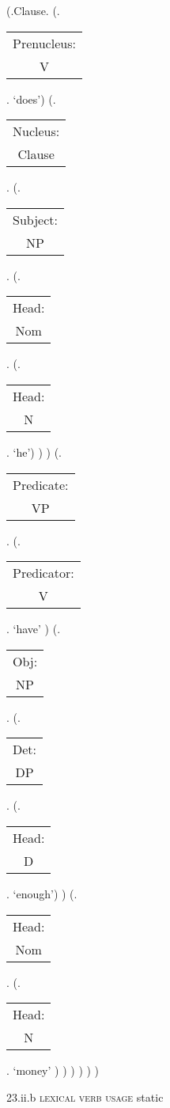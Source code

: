 \documentclass[12pt,letterpaper]{article}
\begin{document}
\begin{figure}
	\begin{center}
		\begin{parsetree}
			(.Clause.
			(.\begin{tabular}{c}Prenucleus:\\V\end{tabular}. `does')
			(.\begin{tabular}{c}Nucleus:\\Clause\end{tabular}.    
			(.\begin{tabular}{c}Subject:\\NP\end{tabular}.  
			(.\begin{tabular}{c}Head:\\Nom\end{tabular}.
			(.\begin{tabular}{c}Head:\\N\end{tabular}. `he')
			)
			)
			(.\begin{tabular}{c}Predicate:\\VP\end{tabular}.
			(.\begin{tabular}{c}Predicator:\\V\end{tabular}.    `have' )
			(.\begin{tabular}{c}Obj:\\NP\end{tabular}.
			(.\begin{tabular}{c}Det:\\DP\end{tabular}.
			(.\begin{tabular}{c}Head:\\D\end{tabular}. `enough')
			)
			(.\begin{tabular}{c}Head:\\Nom\end{tabular}.
			(.\begin{tabular}{c}Head:\\N\end{tabular}. `money' )
			)
			)
			)
			)
			)
			
		\end{parsetree}
		\hfill \break \hfill \break
		23.ii.b \textsc{lexical verb usage} static
	\end{center}
\end{figure}
\end{document}
